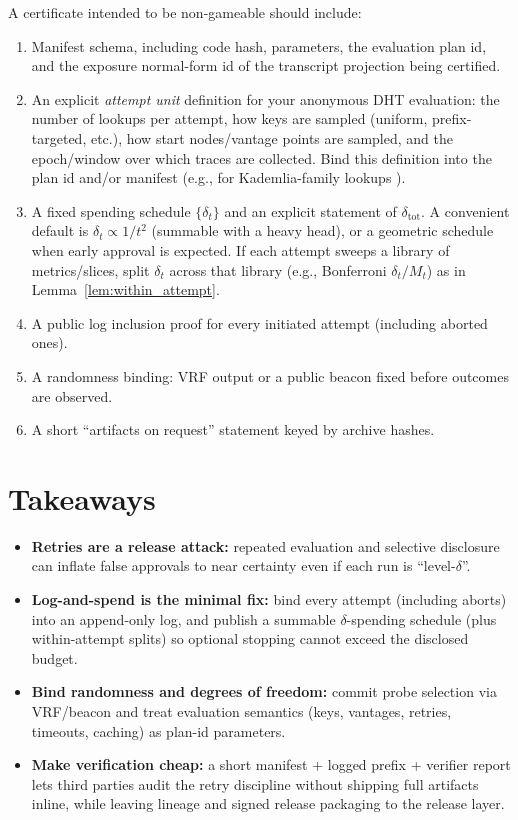 \documentclass[11pt]{article}
\begin{document}
A certificate intended to be non-gameable should include:
\begin{enumerate}
\item Manifest schema, including code hash, parameters, the evaluation plan id, and the exposure normal-form id of the transcript projection being certified.
\item An explicit \emph{attempt unit} definition for your anonymous DHT evaluation: the number of lookups per attempt, how keys are sampled (uniform, prefix-targeted, etc.), how start nodes/vantage points are sampled, and the epoch/window over which traces are collected. Bind this definition into the plan id and/or manifest (e.g., for Kademlia-family lookups \cite{maymounkov2002kademlia}).
\item A fixed spending schedule $\{\delta_t\}$ and an explicit statement of $\delta_{\text{tot}}$. A convenient default is $\delta_t \propto 1/t^2$ (summable with a heavy head), or a geometric schedule when early approval is expected. If each attempt sweeps a library of metrics/slices, split $\delta_t$ across that library (e.g., Bonferroni $\delta_t/M_t$) as in Lemma~\ref{lem:within_attempt}.
\item A public log inclusion proof for every initiated attempt (including aborted ones).
\item A randomness binding: VRF output \cite{rfc9381,micali1999vrf} or a public beacon \cite{drand_spec,nist_beacon} fixed before outcomes are observed.
\item A short ``artifacts on request'' statement keyed by archive hashes.
\end{enumerate}

\section{Takeaways}
\begin{itemize}[leftmargin=*]
\item \textbf{Retries are a release attack:} repeated evaluation and selective disclosure can inflate false approvals to near certainty even if each run is ``level-$\delta$''.
\item \textbf{Log-and-spend is the minimal fix:} bind every attempt (including aborts) into an append-only log, and publish a summable $\delta$-spending schedule (plus within-attempt splits) so optional stopping cannot exceed the disclosed budget.
\item \textbf{Bind randomness and degrees of freedom:} commit probe selection via VRF/beacon and treat evaluation semantics (keys, vantages, retries, timeouts, caching) as plan-id parameters.
\item \textbf{Make verification cheap:} a short manifest + logged prefix + verifier report lets third parties audit the retry discipline without shipping full artifacts inline, while leaving lineage and signed release packaging to the release layer.
\end{itemize}
\end{document}
